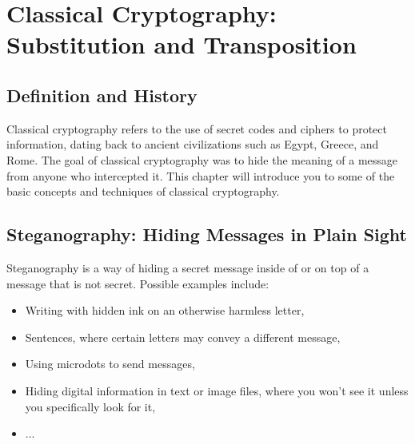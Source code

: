 \documentclass[11pt,a4paper]{report}
\begin{document}
\newpage
%
%
%
%
%
%
%

\section{Classical Cryptography: Substitution and Transposition}

\subsection{Definition and History}

Classical cryptography refers to the use of secret codes and ciphers to protect information, dating back to ancient civilizations such as Egypt, Greece, and Rome. The goal of classical cryptography was to hide the meaning of a message from anyone who intercepted it. This chapter will introduce you to some of the basic concepts and techniques of classical cryptography.

\subsection{Steganography: Hiding Messages in Plain  Sight}
Steganography is a way of hiding a secret message inside of or on top of a message that is not secret. Possible examples include:
\begin{itemize}
\item Writing with hidden ink on an otherwise harmless letter,
\item Sentences, where certain letters may convey a different message,
\item Using microdots to send messages,
\item Hiding digital information in text or image files, where you won't see it unless you specifically look for it,
\item ...
\end{itemize}
\end{document}
